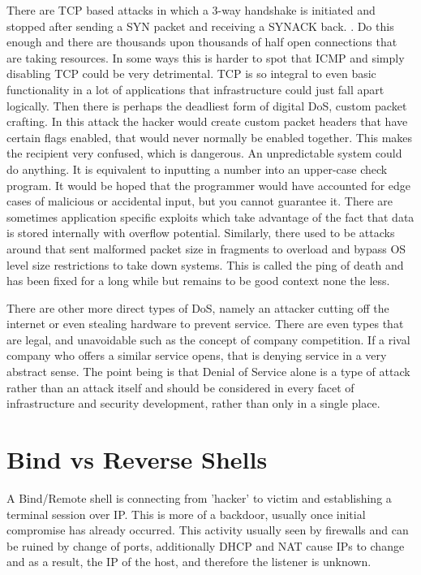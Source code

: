 There are TCP based attacks in which a 3-way handshake is initiated and stopped after sending a SYN packet and receiving a SYNACK back. \citep{DoSMit}. 
Do this enough and there are thousands upon thousands of half open connections that are taking resources. In some ways this is harder to spot that ICMP and simply disabling TCP could be very detrimental. TCP is so integral to even basic functionality in a lot of applications that infrastructure could just fall apart logically. \citep{DoSExplained}
Then there is perhaps the deadliest form of digital DoS, custom packet crafting. In this attack the hacker would create custom packet headers that have certain flags enabled, that would never normally be enabled together. This makes the recipient very confused, which is dangerous. An unpredictable system could do anything. It is equivalent to inputting a number into an upper-case check program. 
It would be hoped that the programmer would have accounted for edge cases of malicious or accidental input, but you cannot guarantee it. There are sometimes application specific exploits which take advantage of the fact that data is stored internally with overflow potential. Similarly, there used to be attacks around that sent malformed packet size in fragments to overload and bypass OS level size restrictions to take down systems. 
This is called the ping of death and has been fixed for a long while but remains to be good context none the less. \citep{ICMPFloodDetPrev}

There are other more direct types of DoS, namely an attacker cutting off the internet or even stealing hardware to prevent service. There are even types that are legal, and unavoidable such as the concept of company competition. If a rival company who offers a similar service opens, that is denying service in a very abstract sense.
The point being is that Denial of Service alone is a type of attack rather than an attack itself and should be considered in every facet of infrastructure and security development, rather than only in a single place.
\citep{AssignmentDOSPaper}


\section{Bind vs Reverse Shells}
A Bind/Remote shell is connecting from 'hacker' to victim and establishing a terminal session over IP. This is more of a backdoor, usually once initial compromise has already occurred. 
This activity usually seen by firewalls and can be ruined by change of ports, additionally DHCP and NAT cause IPs to change and as a result, the IP of the host, and therefore the listener is unknown.

